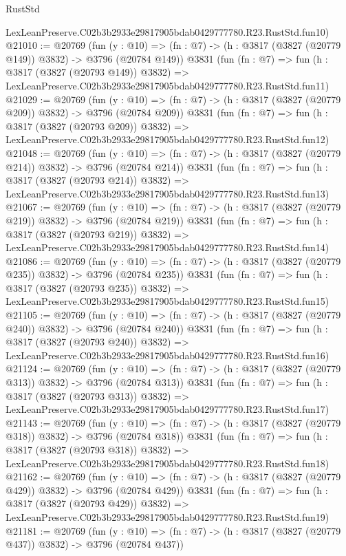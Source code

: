 \begin{lexlean}{RustStd}
\begin{coremodule}
    LexLeanPreserve.C02b3b2933e29817905bdab0429777780.R23.RustStd.fun10)
@21010 := @20769
    (fun (y : @10) => (fn : @7) -> (h : @3817 (@3827 (@20779 @149)) @3832) -> @3796 (@20784 @149))
    @3831
    (fun (fn : @7) =>
    fun (h : @3817 (@3827 (@20793 @149)) @3832) =>
    LexLeanPreserve.C02b3b2933e29817905bdab0429777780.R23.RustStd.fun11)
@21029 := @20769
    (fun (y : @10) => (fn : @7) -> (h : @3817 (@3827 (@20779 @209)) @3832) -> @3796 (@20784 @209))
    @3831
    (fun (fn : @7) =>
    fun (h : @3817 (@3827 (@20793 @209)) @3832) =>
    LexLeanPreserve.C02b3b2933e29817905bdab0429777780.R23.RustStd.fun12)
@21048 := @20769
    (fun (y : @10) => (fn : @7) -> (h : @3817 (@3827 (@20779 @214)) @3832) -> @3796 (@20784 @214))
    @3831
    (fun (fn : @7) =>
    fun (h : @3817 (@3827 (@20793 @214)) @3832) =>
    LexLeanPreserve.C02b3b2933e29817905bdab0429777780.R23.RustStd.fun13)
@21067 := @20769
    (fun (y : @10) => (fn : @7) -> (h : @3817 (@3827 (@20779 @219)) @3832) -> @3796 (@20784 @219))
    @3831
    (fun (fn : @7) =>
    fun (h : @3817 (@3827 (@20793 @219)) @3832) =>
    LexLeanPreserve.C02b3b2933e29817905bdab0429777780.R23.RustStd.fun14)
@21086 := @20769
    (fun (y : @10) => (fn : @7) -> (h : @3817 (@3827 (@20779 @235)) @3832) -> @3796 (@20784 @235))
    @3831
    (fun (fn : @7) =>
    fun (h : @3817 (@3827 (@20793 @235)) @3832) =>
    LexLeanPreserve.C02b3b2933e29817905bdab0429777780.R23.RustStd.fun15)
@21105 := @20769
    (fun (y : @10) => (fn : @7) -> (h : @3817 (@3827 (@20779 @240)) @3832) -> @3796 (@20784 @240))
    @3831
    (fun (fn : @7) =>
    fun (h : @3817 (@3827 (@20793 @240)) @3832) =>
    LexLeanPreserve.C02b3b2933e29817905bdab0429777780.R23.RustStd.fun16)
@21124 := @20769
    (fun (y : @10) => (fn : @7) -> (h : @3817 (@3827 (@20779 @313)) @3832) -> @3796 (@20784 @313))
    @3831
    (fun (fn : @7) =>
    fun (h : @3817 (@3827 (@20793 @313)) @3832) =>
    LexLeanPreserve.C02b3b2933e29817905bdab0429777780.R23.RustStd.fun17)
@21143 := @20769
    (fun (y : @10) => (fn : @7) -> (h : @3817 (@3827 (@20779 @318)) @3832) -> @3796 (@20784 @318))
    @3831
    (fun (fn : @7) =>
    fun (h : @3817 (@3827 (@20793 @318)) @3832) =>
    LexLeanPreserve.C02b3b2933e29817905bdab0429777780.R23.RustStd.fun18)
@21162 := @20769
    (fun (y : @10) => (fn : @7) -> (h : @3817 (@3827 (@20779 @429)) @3832) -> @3796 (@20784 @429))
    @3831
    (fun (fn : @7) =>
    fun (h : @3817 (@3827 (@20793 @429)) @3832) =>
    LexLeanPreserve.C02b3b2933e29817905bdab0429777780.R23.RustStd.fun19)
@21181 := @20769
    (fun (y : @10) => (fn : @7) -> (h : @3817 (@3827 (@20779 @437)) @3832) -> @3796 (@20784 @437))

\end{coremodule}
\end{lexlean}
